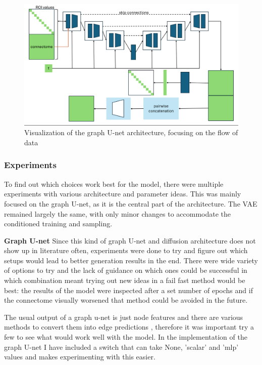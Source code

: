	\begin{figure}[!h]
		\centering
		\includegraphics[width=\textwidth]{figures/own_gunet.png}
		\caption{Visualization of the graph U-net architecture, focusing on the flow of data}
	\end{figure}
	
	
	\subsubsection{Experiments}
	
	To find out which choices work best for the model, there were multiple experiments with various architecture and parameter ideas. This was mainly focused on the graph U-net, as it is the central part of the architecture. The VAE remained largely the same, with only minor changes to accommodate the conditioned training and sampling.

	\textbf{Graph U-net} Since this kind of graph U-net and diffusion architecture does not show up in literature often, experiments were done to try and figure out which setups would lead to better generation results in the end. There were wide variety of options to try and the lack of guidance on which ones could be successful in which combination meant trying out new ideas in a fail fast method would be best: the results of the model were inspected after a set number of epochs and if the connectome visually worsened that method could be avoided in the future.
	
	The usual output of a graph u-net is just node features and there are various methods to convert them into edge predictions \cite{li2023evaluating}, therefore it was important try a few to see what would work well with the model. In the implementation of the graph U-net I have included a switch that can take None, ’scalar’ and ’mlp’ values and makes experimenting with this easier. 
	
